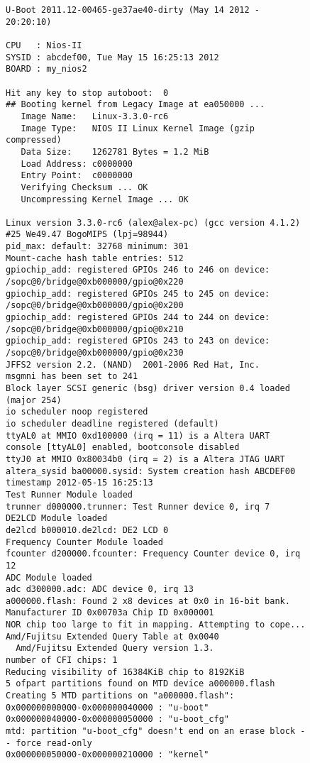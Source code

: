 \begin{figure}[h!]
\lstset{basicstyle=\tiny\ttfamily}
\begin{lstlisting}
U-Boot 2011.12-00465-ge37ae40-dirty (May 14 2012 - 20:20:10)

CPU   : Nios-II
SYSID : abcdef00, Tue May 15 16:25:13 2012
BOARD : my_nios2

Hit any key to stop autoboot:  0 
## Booting kernel from Legacy Image at ea050000 ...
   Image Name:   Linux-3.3.0-rc6
   Image Type:   NIOS II Linux Kernel Image (gzip compressed)
   Data Size:    1262781 Bytes = 1.2 MiB
   Load Address: c0000000
   Entry Point:  c0000000
   Verifying Checksum ... OK
   Uncompressing Kernel Image ... OK

Linux version 3.3.0-rc6 (alex@alex-pc) (gcc version 4.1.2) #25 We49.47 BogoMIPS (lpj=98944)
pid_max: default: 32768 minimum: 301
Mount-cache hash table entries: 512
gpiochip_add: registered GPIOs 246 to 246 on device: /sopc@0/bridge@0xb000000/gpio@0x220
gpiochip_add: registered GPIOs 245 to 245 on device: /sopc@0/bridge@0xb000000/gpio@0x200
gpiochip_add: registered GPIOs 244 to 244 on device: /sopc@0/bridge@0xb000000/gpio@0x210
gpiochip_add: registered GPIOs 243 to 243 on device: /sopc@0/bridge@0xb000000/gpio@0x230
JFFS2 version 2.2. (NAND)  2001-2006 Red Hat, Inc.
msgmni has been set to 241
Block layer SCSI generic (bsg) driver version 0.4 loaded (major 254)
io scheduler noop registered
io scheduler deadline registered (default)
ttyAL0 at MMIO 0xd100000 (irq = 11) is a Altera UART
console [ttyAL0] enabled, bootconsole disabled
ttyJ0 at MMIO 0x80034b0 (irq = 2) is a Altera JTAG UART
altera_sysid ba00000.sysid: System creation hash ABCDEF00 timestamp 2012-05-15 16:25:13
Test Runner Module loaded
trunner d000000.trunner: Test Runner device 0, irq 7
DE2LCD Module loaded
de2lcd b000010.de2lcd: DE2 LCD 0
Frequency Counter Module loaded
fcounter d200000.fcounter: Frequency Counter device 0, irq 12
ADC Module loaded
adc d300000.adc: ADC device 0, irq 13
a000000.flash: Found 2 x8 devices at 0x0 in 16-bit bank. Manufacturer ID 0x00703a Chip ID 0x000001
NOR chip too large to fit in mapping. Attempting to cope...
Amd/Fujitsu Extended Query Table at 0x0040
  Amd/Fujitsu Extended Query version 1.3.
number of CFI chips: 1
Reducing visibility of 16384KiB chip to 8192KiB
5 ofpart partitions found on MTD device a000000.flash
Creating 5 MTD partitions on "a000000.flash":
0x000000000000-0x000000040000 : "u-boot"
0x000000040000-0x000000050000 : "u-boot_cfg"
mtd: partition "u-boot_cfg" doesn't end on an erase block -- force read-only
0x000000050000-0x000000210000 : "kernel"

\end{lstlisting}
\end{figure}
